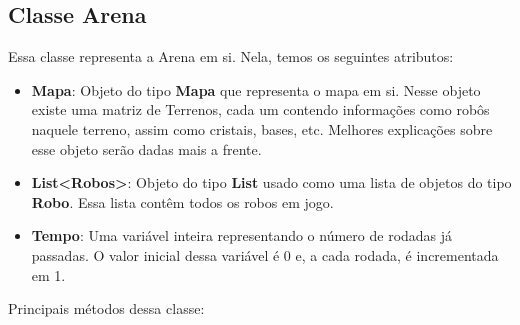 \documentclass[11pt]{article}
\begin{document}
\subsection{Classe Arena}


Essa classe representa a Arena em si. Nela, temos os seguintes atributos:

\begin{itemize}

	\item \textbf{Mapa}: Objeto do tipo \textbf{\color{red}Mapa} que representa o mapa em si. Nesse objeto existe uma matriz de Terrenos, cada um contendo informações como robôs naquele terreno, assim como cristais, bases, etc. Melhores explicações sobre esse objeto serão dadas mais a frente.
	
	\item \textbf{List<{\color{red}Robos}>}: Objeto do tipo \textbf{\color{red}List} usado como uma lista de objetos do tipo \textbf{\color{red}Robo}. Essa lista contêm todos os robos em jogo.
	
	\item \textbf{Tempo}: Uma variável inteira representando o número de rodadas já passadas. O valor inicial dessa variável é 0 e, a cada rodada, é incrementada em 1.

\end{itemize}

Principais métodos dessa classe:
\end{document}
